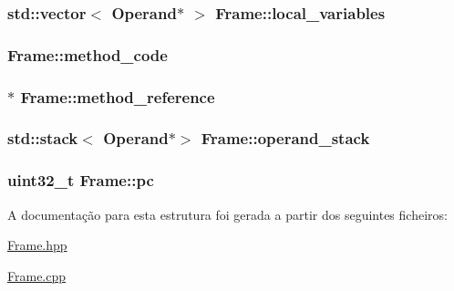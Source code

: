 \subsubsection[{\texorpdfstring{local\+\_\+variables}{local_variables}}]{\setlength{\rightskip}{0pt plus 5cm}std\+::vector$<$ {\bf Operand}$\ast$ $>$ Frame\+::local\+\_\+variables}\hypertarget{struct_frame_aed517b3bbbefabb20d8e990623ac3118}{}\label{struct_frame_aed517b3bbbefabb20d8e990623ac3118}
\subsubsection[{\texorpdfstring{method\+\_\+code}{method_code}}]{ Frame\+::method\+\_\+code}\hypertarget{struct_frame_a7eac6c489fcfc2de43409f405d360a3d}{}\label{struct_frame_a7eac6c489fcfc2de43409f405d360a3d}
\subsubsection[{\texorpdfstring{method\+\_\+reference}{method_reference}}]{$\ast$ Frame\+::method\+\_\+reference}\hypertarget{struct_frame_ad7c3164833be265d690a786a172ca80a}{}\label{struct_frame_ad7c3164833be265d690a786a172ca80a}
\subsubsection[{\texorpdfstring{operand\+\_\+stack}{operand_stack}}]{\setlength{\rightskip}{0pt plus 5cm}std\+::stack$<$ {\bf Operand}$\ast$$>$ Frame\+::operand\+\_\+stack}\hypertarget{struct_frame_a30eaf6634fbadf9dd4c6a8c05b92d3a4}{}\label{struct_frame_a30eaf6634fbadf9dd4c6a8c05b92d3a4}
\subsubsection[{\texorpdfstring{pc}{pc}}]{\setlength{\rightskip}{0pt plus 5cm}uint32\+\_\+t Frame\+::pc}\hypertarget{struct_frame_a91e50d2091184efb52b6d7c0c21fd4b2}{}\label{struct_frame_a91e50d2091184efb52b6d7c0c21fd4b2}


A documentação para esta estrutura foi gerada a partir dos seguintes ficheiros\+:\begin{DoxyCompactItemize}
\item 
\hyperlink{_frame_8hpp}{Frame.\+hpp}\item 
\hyperlink{_frame_8cpp}{Frame.\+cpp}\end{DoxyCompactItemize}
